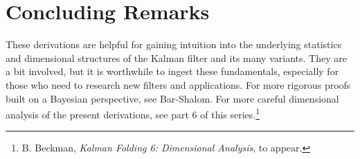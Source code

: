 \documentclass[10pt,oneside,x11names]{article}
\begin{document}
\section{Concluding Remarks}
\label{sec:orgheadline18}

These derivations are helpful for gaining intuition into the underlying
statistics and dimensional structures of the Kalman filter and its many
variants. They are a bit involved, but it is worthwhile to ingest these
fundamentals, especially for those who need to research new filters and
applications. For more rigorous proofs built on a Bayesian perspective, see
Bar-Shalom.\footnotemark[2]{} For more careful dimensional analysis of the present
derivations, see part 6 of this series.\footnote{B. Beckman, \emph{Kalman Folding 6: Dimensional Analysis}, to appear.}
\end{document}
